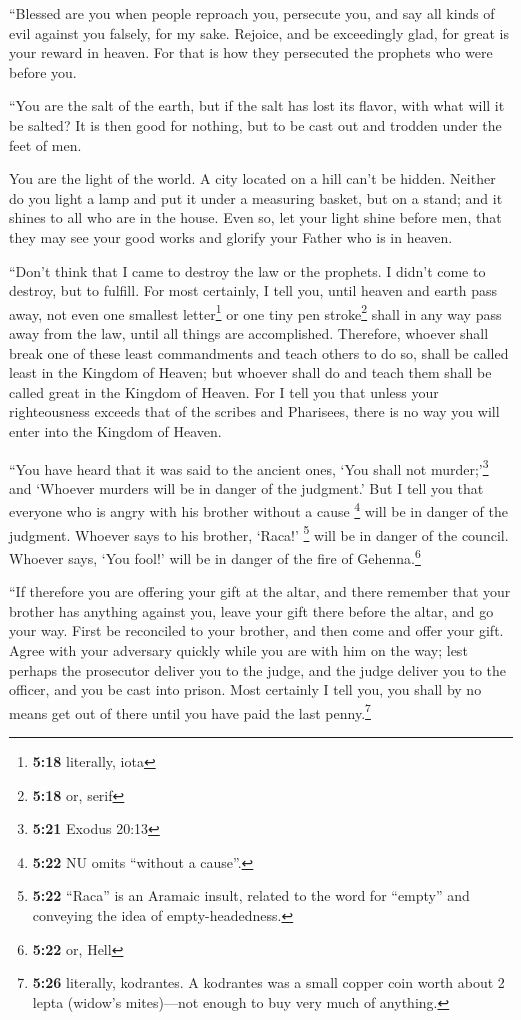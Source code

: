  ``Blessed are you when people reproach you, persecute
you, and say all kinds of evil against you falsely, for my sake.
 Rejoice, and be exceedingly glad, for great is your
reward in heaven. For that is how they persecuted the prophets who were
before you.

 ``You are the salt of the earth, but if the salt has
lost its flavor, with what will it be salted? It is then good for
nothing, but to be cast out and trodden under the feet of men.

 You are the light of the world. A city located on a hill
can't be hidden.  Neither do you light a lamp and put it
under a measuring basket, but on a stand; and it shines to all who are
in the house.  Even so, let your light shine before men,
that they may see your good works and glorify your Father who is in
heaven.

 ``Don't think that I came to destroy the law or the
prophets. I didn't come to destroy, but to fulfill.  For
most certainly, I tell you, until heaven and earth pass away, not even
one smallest letter\footnote{\textbf{5:18} literally, iota} or one tiny
pen stroke\footnote{\textbf{5:18} or, serif} shall in any way pass away
from the law, until all things are accomplished. 
Therefore, whoever shall break one of these least commandments and teach
others to do so, shall be called least in the Kingdom of Heaven; but
whoever shall do and teach them shall be called great in the Kingdom of
Heaven.  For I tell you that unless your righteousness
exceeds that of the scribes and Pharisees, there is no way you will
enter into the Kingdom of Heaven.

 ``You have heard that it was said to the ancient ones,
`You shall not murder;'\footnote{\textbf{5:21} Exodus 20:13} and
`Whoever murders will be in danger of the judgment.'  But
I tell you that everyone who is angry with his brother without a cause
\footnote{\textbf{5:22} NU omits ``without a cause''.} will be in danger
of the judgment. Whoever says to his brother, `Raca!' \footnote{\textbf{5:22}
  ``Raca'' is an Aramaic insult, related to the word for ``empty'' and
  conveying the idea of empty-headedness.} will be in danger of the
council. Whoever says, `You fool!' will be in danger of the fire of
Gehenna.\footnote{\textbf{5:22} or, Hell}

 ``If therefore you are offering your gift at the altar,
and there remember that your brother has anything against you,
 leave your gift there before the altar, and go your way.
First be reconciled to your brother, and then come and offer your gift.
 Agree with your adversary quickly while you are with him
on the way; lest perhaps the prosecutor deliver you to the judge, and
the judge deliver you to the officer, and you be cast into prison.
 Most certainly I tell you, you shall by no means get out
of there until you have paid the last penny.\footnote{\textbf{5:26}
  literally, kodrantes. A kodrantes was a small copper coin worth about
  2 lepta (widow's mites)---not enough to buy very much of anything.}

